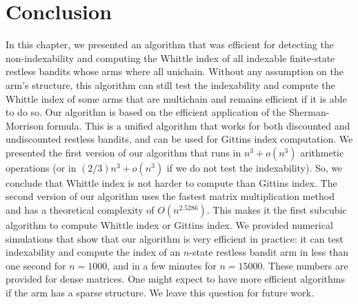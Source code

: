 \section{Conclusion}
\label{sec:conclusion}

In this chapter, we presented an algorithm that was efficient for detecting the non-indexability and computing the Whittle index of all indexable finite-state restless bandits whose arms where all unichain. Without any assumption on the arm's structure, this algorithm can still test the indexability and compute the Whittle index of some arms that are multichain and remains efficient if it is able to do so.
Our algorithm is based on the efficient application of the Sherman-Morrison formula. This is a unified algorithm that works for both discounted and undiscounted restless bandits, and can be used for Gittins index computation.  We presented the first version of our algorithm that runs in $n^3+o(n^3)$ arithmetic operations (or in $(2/3)n^3+o(n^3)$ if we do not test the indexability). So, we conclude that Whittle index is not harder to compute than Gittins index. The second version of our algorithm uses the fastest matrix multiplication method and has a theoretical complexity of $O(n^{2.5286})$. This makes it the first subcubic algorithm to compute Whittle index or Gittins index. We provided numerical simulations that show that our algorithm is very efficient in practice: it can test indexability and compute the index of an $n$-state restless bandit arm in less than one second for $n=1000$, and in a few minutes for $n=15000$. These numbers are provided for dense matrices. One might expect to have more efficient algorithms if the arm has a sparse structure. We leave this question for future work. 

\newpage

